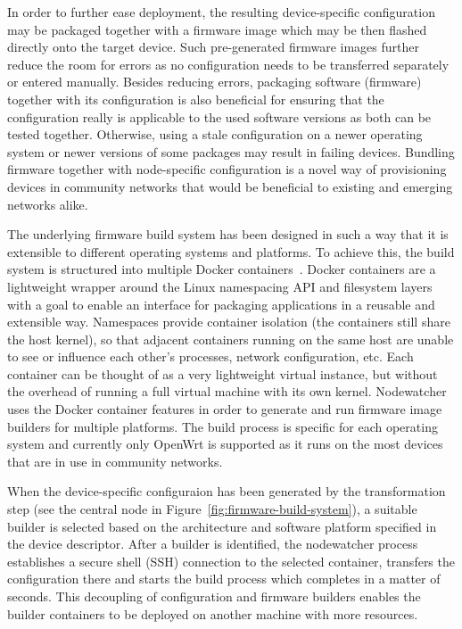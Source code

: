 \documentclass[5p,sort&compress]{elsarticle}
\begin{document}
In order to further ease deployment, the resulting device-specific configuration may be packaged together with a firmware image which may be then flashed directly onto the target device.
Such pre-generated firmware images further reduce the room for errors as no configuration needs to be transferred separately or entered manually.
Besides reducing errors, packaging software (firmware) together with its configuration is also beneficial for ensuring that the configuration really is applicable to the used software versions as both can be tested together.
Otherwise, using a stale configuration on a newer operating system or newer versions of some packages may result in failing devices.
Bundling firmware together with node-specific configuration is a novel way of provisioning devices in community networks  that would be beneficial to existing and emerging networks alike.

The underlying firmware build system has been designed in such a way that it is extensible to different operating systems and platforms.
To achieve this, the build system is structured into multiple Docker containers~\cite{Docker_2013}.
Docker containers are a lightweight wrapper around the Linux namespacing API and filesystem layers with a goal to enable an interface for packaging applications in a reusable and extensible way.
Namespaces provide container isolation (the containers still share the host kernel), so that adjacent containers running on the same host are unable to see or influence each other's processes, network configuration, etc.
Each container can be thought of as a very lightweight virtual instance, but without the overhead of running a full virtual machine with its own kernel.
Nodewatcher uses the Docker container features in order to generate and run firmware image builders for multiple platforms.
The build process is specific for each operating system and currently only OpenWrt is supported as it runs on the most devices that are in use in community networks.

When the device-specific configuraion has been generated by the transformation step (see the central node in Figure~\ref{fig:firmware-build-system}), a suitable builder is selected based on the architecture and software platform specified in the device descriptor.
After a builder is identified, the nodewatcher process establishes a secure shell (SSH) connection to the selected container, transfers the configuration there and starts the build process which completes in a matter of seconds.
This decoupling of configuration and firmware builders enables the builder containers to be deployed on another machine with more resources.
\end{document}
